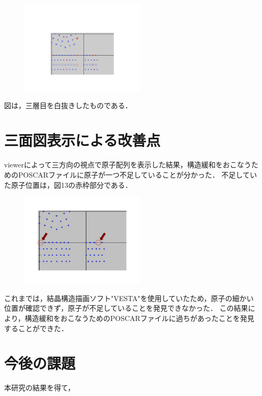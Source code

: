 \begin{figure}[htbp]\begin{center}
\includegraphics[width=6cm,bb=0 0 442 500]{../figs/./boundary_narita.012.jpg}
\caption{}
\label{default}\end{center}\end{figure}
図は，三層目を白抜きしたものである．

\section{三面図表示による改善点}
viewerによって三方向の視点で原子配列を表示した結果，構造緩和をおこなうためのPOSCARファイルに原子が一つ不足していることが分かった．
不足していた原子位置は，図13の赤枠部分である．

\begin{figure}[htbp]\begin{center}
\includegraphics[width=6cm,bb=0 0 442 500]{../figs/./boundary_narita.013.jpg}
\caption{}
\label{default}\end{center}\end{figure}
これまでは，結晶構造描画ソフト"VESTA"を使用していたため，原子の細かい位置が確認できず，原子が不足していることを発見できなかった．
この結果により，構造緩和をおこなうためのPOSCARファイルに過ちがあったことを発見することができた．

\section{今後の課題}
本研究の結果を得て，

